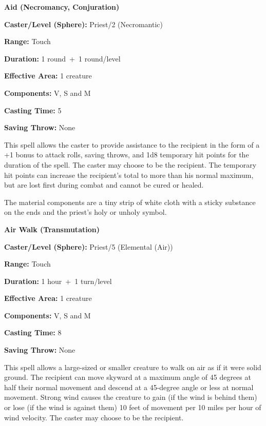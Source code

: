 \begin{multicols}{2}
\begin{minipage}{\columnwidth}
\noindent \textbf{Aid (Necromancy, Conjuration)}

\noindent \textbf{Caster/Level (Sphere):} Priest/2 (Necromantic)

\noindent \textbf{Range:} Touch

\noindent \textbf{Duration:} 1 round~+~1 round/level

\noindent \textbf{Effective Area:} 1 creature

\noindent \textbf{Components:} V, S and M

\noindent \textbf{Casting Time:} 5

\noindent \textbf{Saving Throw:} None

\end{minipage}

This spell allows the caster to provide assistance to the recipient in the form of a +1 bonus to attack rolls, saving throws, and 1d8 temporary hit points for the duration of the spell.  The caster may choose to be the recipient.  The temporary hit points can increase the recipient's total to more than his normal maximum, but are lost first during combat and cannot be cured or healed.

The material components are a tiny strip of white cloth with a sticky substance on the ends and the priest's holy or unholy symbol.

\vspace{1em}

\noindent
\begin{minipage}{\columnwidth}

\noindent \textbf{Air Walk (Transmutation)}

\noindent \textbf{Caster/Level (Sphere):} Priest/5 (Elemental (Air))

\noindent \textbf{Range:} Touch

\noindent \textbf{Duration:} 1 hour~+~1 turn/level

\noindent \textbf{Effective Area:} 1 creature

\noindent \textbf{Components:} V, S and M

\noindent \textbf{Casting Time:} 8

\noindent \textbf{Saving Throw:} None

\end{minipage}

This spell allows a large-sized or smaller creature to walk on air as if it were solid ground.  The recipient can move skyward at a maximum angle of 45 degrees at half their normal movement and descend at a 45-degree angle or less at normal movement.  Strong wind causes the creature to gain (if the wind is behind them) or lose (if the wind is against them) 10 feet of movement per 10 miles per hour of wind velocity.  The caster may choose to be the recipient.


\end{multicols}
